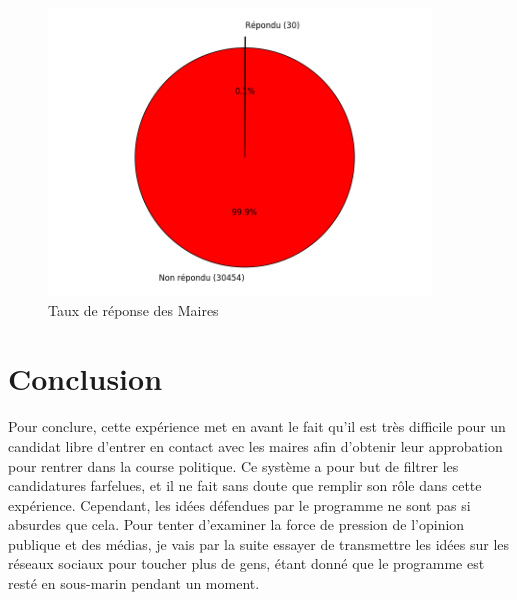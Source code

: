 \documentclass{article}
\begin{document}
\begin{figure}[h]
    \centering
    \includegraphics[width=4in]{answers.png}
    \caption{Taux de réponse des Maires}
    \label{answers}
\end{figure}

\section{Conclusion}
Pour conclure, cette expérience met en avant le fait qu'il est très difficile pour un candidat libre d'entrer en contact avec les maires afin d'obtenir leur approbation pour rentrer dans la course politique. Ce système a pour but de filtrer les candidatures farfelues, et il ne fait sans doute que remplir son rôle dans cette expérience.
Cependant, les idées défendues par le programme ne sont pas si absurdes que cela. Pour tenter d'examiner la force de pression de l'opinion publique et des médias, je vais par la suite essayer de transmettre les idées sur les réseaux sociaux pour toucher plus de gens, étant donné que le programme est resté en sous-marin pendant un moment.
\end{document}
